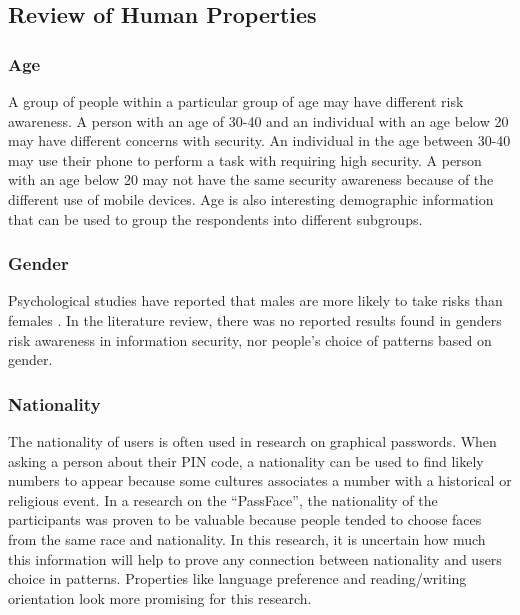     \subsection{Review of Human Properties} \label{sec:datarequirements}

      \subsubsection*{Age}
      A group of people within a particular group of age may have different risk awareness. A person with an age of 30-40 and an individual with an age below 20 may have different concerns with security. An individual in the age between 30-40 may use their phone to perform a task with requiring high security. A person with an age below 20 may not have the same security awareness because of the different use of mobile devices. Age is also interesting demographic information that can be used to group the respondents into different subgroups.

      \subsubsection*{Gender}
      Psychological studies have reported that males are more likely to take risks than females \cite{Byrnes}. In the literature review, there was no reported results found in genders risk awareness in information security, nor people's choice of patterns based on gender.  
      
      \subsubsection*{Nationality} The nationality of users is often used in research on graphical passwords. When asking a person about their PIN code, a nationality can be used to find likely numbers to appear because some cultures associates a number with a historical or religious event. In a research on the ``PassFace'', the nationality of the participants was proven to be valuable because people tended to choose faces from the same race and nationality. In this research, it is uncertain how much this information will help to prove any connection between nationality and users choice in patterns. Properties like language preference and reading/writing orientation look more promising for this research.
      
